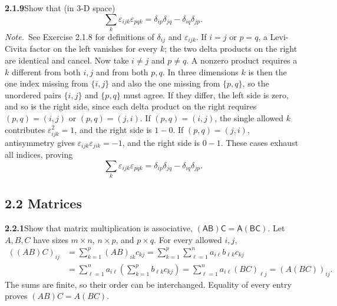 \par\bigskip
\noindent\textbf{2.1.9}\quad Show that (in 3-D space)
\[
\sum_{k}\varepsilon_{ijk}\varepsilon_{pqk}
=\delta_{ip}\delta_{jq}-\delta_{iq}\delta_{jp}.
\]
\emph{Note.}~See Exercise 2.1.8 for definitions of $\delta_{ij}$ and
$\varepsilon_{ijk}$.
\solution
{}
If $i=j$ or $p=q$, a Levi-Civita factor on the left vanishes for
every $k$; the two delta products on the right are identical and cancel.
Now take $i\ne j$ and $p\ne q$. A nonzero product requires a $k$
different from both $i,j$ and from both $p,q$. In three dimensions
$k$ is then the one index missing from $\{i,j\}$ and also the one
missing from $\{p,q\}$, so the unordered pairs $\{i,j\}$ and
$\{p,q\}$ must agree. If they differ, the left side is zero, and so
is the right side, since each delta product on the right requires
$(p,q)=(i,j)$ or $(p,q)=(j,i)$. If $(p,q)=(i,j)$, the single
allowed $k$ contributes $\varepsilon_{ijk}^2=1$, and the right side is
$1-0$. If $(p,q)=(j,i)$, antisymmetry gives
$\varepsilon_{ijk}\varepsilon_{jik}=-1$, and the right side is $0-1$.
These cases exhaust all indices, proving
\[
\boxed{\sum_k\varepsilon_{ijk}\varepsilon_{pqk}
=\delta_{ip}\delta_{jq}-\delta_{iq}\delta_{jp}}.
\]

\subsection*{2.2 Matrices}

\par\bigskip
\noindent\textbf{2.2.1}\quad Show that matrix multiplication is associative,
$(\mathsf{AB})\mathsf{C}=\mathsf{A}(\mathsf{BC})$.
\solution
Let $A,B,C$ have sizes $m\times n$, $n\times p$, and $p\times q$.
For every allowed $i,j$,
\[
\begin{aligned}
((AB)C)_{ij}
&=\sum_{k=1}^p(AB)_{ik}c_{kj}
=\sum_{k=1}^p\sum_{\ell=1}^n a_{i\ell}b_{\ell k}c_{kj}\\
&=\sum_{\ell=1}^n a_{i\ell}
       \left(\sum_{k=1}^p b_{\ell k}c_{kj}\right)
=\sum_{\ell=1}^n a_{i\ell}(BC)_{\ell j}
=(A(BC))_{ij}.
\end{aligned}
\]
The sums are finite, so their order can be interchanged. Equality of
every entry proves $(AB)C=A(BC)$.

